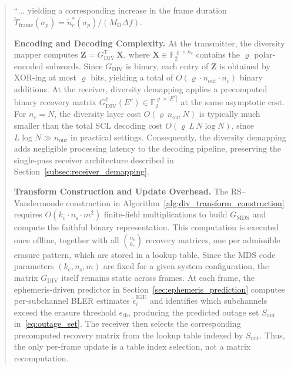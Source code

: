 \begin{quote}
``$\ldots$ yielding a corresponding increase in the frame duration
$\check{T}_{\mathrm{frame}}(\sigma_p) =
\check{n}_c^{*}(\sigma_p)/(M_{\mathrm{D}}\Delta f)$.

{\color{blue}\textbf{Encoding and Decoding Complexity.}
At the transmitter, the diversity mapper computes
$\mathbf{Z} = G_{\mathrm{DIV}}^{\mathsf{T}}\,\mathbf{X}$, where
$\mathbf{X} \in \mathbb{F}_2^{\varrho \times n_c}$ contains the
$\varrho$ polar-encoded subwords. Since $G_{\mathrm{DIV}}$ is binary,
each entry of $\mathbf{Z}$ is obtained by XOR-ing at most $\varrho$
bits, yielding a total of
$O(\varrho \cdot n_{\mathrm{out}} \cdot n_c)$ binary additions.
At the receiver, diversity demapping applies a precomputed binary
recovery matrix
$G_{\mathrm{DIV}}^{\dagger}(E^c) \in
\mathbb{F}_2^{\varrho \times |E^c|}$
at the same asymptotic cost. For $n_c = N$, the diversity layer cost
$O(\varrho\, n_{\mathrm{out}}\, N)$ is typically much smaller than
the total SCL decoding cost $O(\varrho\, L\, N \log N)$, since
$L \log N \gg n_{\mathrm{out}}$ in practical settings. Consequently, the diversity demapping adds negligible
processing latency to the decoding pipeline, preserving the
single-pass receiver architecture described in
Section~\ref{subsec:receiver_demapping}.}

{\color{blue}\textbf{Transform Construction and Update Overhead.}
The RS--Vandermonde construction in
Algorithm~\ref{alg:div_transform_construction} requires
$O(k_{\mathrm{c}} \cdot n_{\mathrm{s}} \cdot m^2)$ finite-field
multiplications to build $G_{\mathrm{MDS}}$ and compute the faithful
binary representation. This computation is executed once offline,
together with all $\binom{n_{\mathrm{s}}}{k_{\mathrm{c}}}$ recovery
matrices, one per admissible erasure pattern, which are stored in a
lookup table.
Since the MDS code parameters $(k_{\mathrm{c}}, n_{\mathrm{s}}, m)$
are fixed for a given system configuration, the matrix
$G_{\mathrm{DIV}}$ itself remains static across frames.
At each frame, the ephemeris-driven predictor in
Section~\ref{sec:ephemeris_prediction} computes per-subchannel
BLER estimates $\tilde{\epsilon}_{i}^{\mathrm{E2E}}$ and
identifies which subchannels exceed the erasure threshold
$\epsilon_{\mathrm{th}}$, producing the predicted outage set
$S_{\mathrm{out}}$ in~\eqref{eq:outage_set}. The receiver then
selects the corresponding precomputed recovery matrix from the
lookup table indexed by $S_{\mathrm{out}}$. Thus, the only
per-frame update is a table index selection, not a matrix
recomputation.}


\end{quote}
